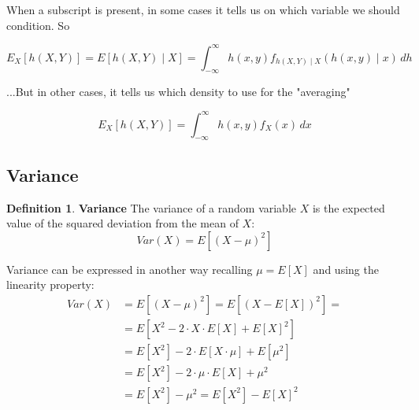 \documentclass[12pt, letterpaper]{article}
\theoremstyle{definition}
\newtheorem{definition}{Definition}[section]
\begin{document}
When a subscript is present, in some cases it tells us on which variable we should condition. So

$$E_X[h(X,Y)] = E[h(X,Y)\mid X] = \int_{-\infty}^\infty h(x,y) f_{h(X,Y)\mid X}(h(x,y)\mid x)\,dh  $$

...But in other cases, it tells us which density to use for the "averaging"

$$E_X[h(X,Y)] = \int_{-\infty}^\infty h(x,y) f_{X}(x) \, dx $$


\subsection{Variance}
\label{Variance}
\begin{definition}{\textbf{Variance}}
The variance of a random variable $X$ is the expected value of the squared deviation from the mean of $X$:
\begin{equation}
Var\left( X\right) = E\left[ \left( X - \mu \right)^2\right] 
\end{equation}

Variance can be expressed in another way recalling $\mu = E\left[ X\right]$ and using the linearity property:
\begin{equation}
\begin{aligned}
	Var\left( X\right) &= E\left[ \left( X - \mu \right)^2\right] = E\left[ \left( X - E\left[ X\right] \right)^2\right] =\\
	&= E\left[ X^2 - 2\cdot X \cdot E\left[ X\right] + E\left[ X\right] ^2\right]\\
	&= E\left[ X^2\right] - 2\cdot E\left[X \cdot \mu \right]+ E\left[\mu^2\right]\\
	&= E\left[ X^2\right] - 2\cdot \mu \cdot E\left[X\right]+\mu^2 \\
	&= E\left[ X^2\right] - \mu^2 = E\left[ X^2\right] - E\left[ X\right] ^2 \\
\end{aligned}
\end{equation}

\end{definition}
\end{document}

